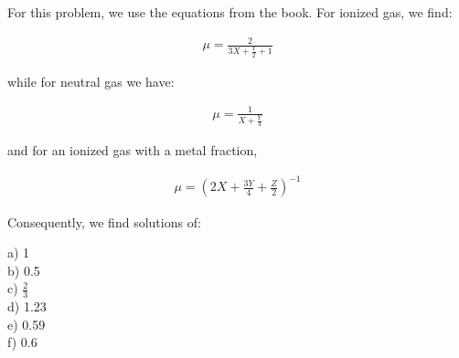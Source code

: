 \documentclass[12pt]{article}
\newenvironment{answer}[2][Answer]{\begin{trivlist}
\item[\hskip \labelsep {\bfseries #1}\hskip \labelsep {\bfseries #2.}]}{\end{trivlist}}
\begin{document}
\begin{answer}{1}

  For this problem, we use the equations from the book. For ionized gas, we find:

  \begin{align*}
    \mu = \frac{2}{3X + \frac{Y}{2} + 1}
  \end{align*}

  while for neutral gas we have:

  \begin{align*}
    \mu = \frac{1}{X + \frac{Y}{4}}
  \end{align*}

  and for an ionized gas with a metal fraction,

  \begin{align*}
    \mu = (2X + \frac{3Y}{4} + \frac{Z}{2})^{-1}
  \end{align*}

  Consequently, we find solutions of:

  a) 1 \\

  b) 0.5 \\

  c) $\frac{2}{3}$ \\

  d) 1.23 \\

  e) 0.59 \\

  f) 0.6 \\

\end{answer}
\end{document}
